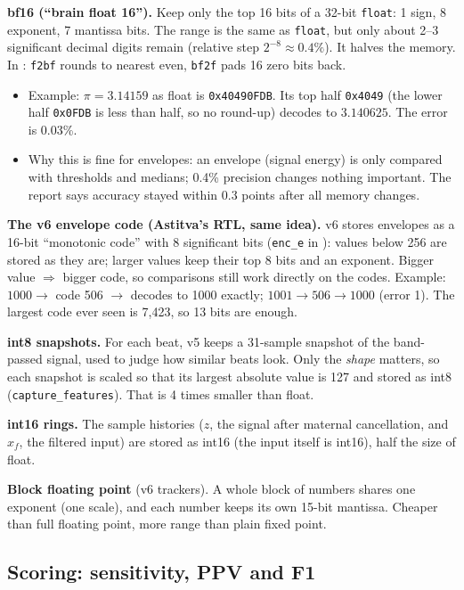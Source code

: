 \documentclass[11pt]{article}
\begin{document}
\textbf{bf16 (``brain float 16'').} Keep only the top 16 bits of a 32-bit \texttt{float}: 1 sign, 8 exponent, 7 mantissa bits. The range is the same as \texttt{float}, but only about 2--3 significant decimal digits remain (relative step $2^{-8}\approx 0.4\%$). It halves the memory. In : \texttt{f2bf} rounds to nearest even, \texttt{bf2f} pads 16 zero bits back.
\begin{itemize}
  \item Example: $\pi = 3.14159$ as float is \texttt{0x40490FDB}. Its top half \texttt{0x4049} (the lower half \texttt{0x0FDB} is less than half, so no round-up) decodes to $3.140625$. The error is 0.03\%.
  \item Why this is fine for envelopes: an envelope (signal energy) is only compared with thresholds and medians; 0.4\% precision changes nothing important. The report says accuracy stayed within 0.3 points after all memory changes.
\end{itemize}

\textbf{The v6 envelope code (Astitva's RTL, same idea).} v6 stores envelopes as a 16-bit ``monotonic code'' with 8 significant bits (\texttt{enc\_e} in ): values below 256 are stored as they are; larger values keep their top 8 bits and an exponent. Bigger value $\Rightarrow$ bigger code, so comparisons still work directly on the codes. Example: $1000 \to$ code 506 $\to$ decodes to 1000 exactly; $1001 \to 506 \to 1000$ (error 1). The largest code ever seen is 7,423, so 13 bits are enough.

\textbf{int8 snapshots.} For each beat, v5 keeps a 31-sample snapshot of the band-passed signal, used to judge how similar beats look. Only the \emph{shape} matters, so each snapshot is scaled so that its largest absolute value is 127 and stored as int8 (\texttt{capture\_features}). That is 4 times smaller than float.

\textbf{int16 rings.} The sample histories ($z$, the signal after maternal cancellation, and $x_f$, the filtered input) are stored as int16 (the input itself is int16), half the size of float.

\textbf{Block floating point} (v6 trackers). A whole block of numbers shares one exponent (one scale), and each number keeps its own 15-bit mantissa. Cheaper than full floating point, more range than plain fixed point.

\subsection{Scoring: sensitivity, PPV and F1}
\label{sec:f1}
\end{document}
